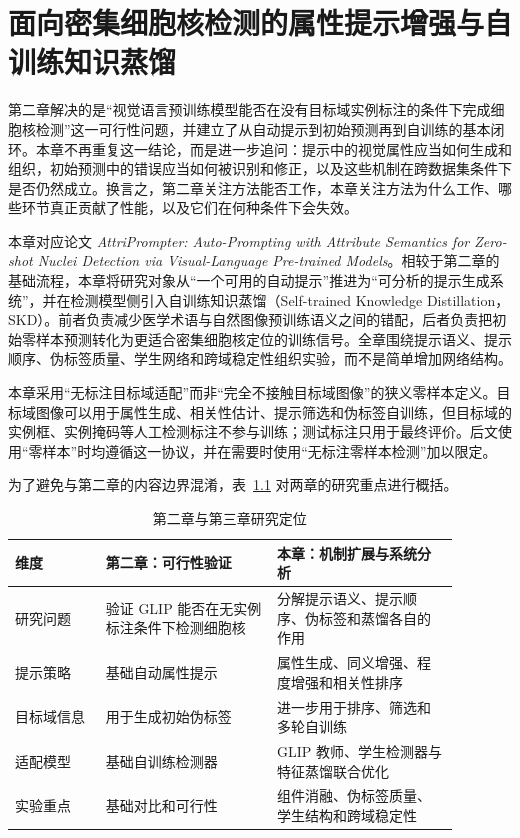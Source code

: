 \chapter{面向密集细胞核检测的属性提示增强与自训练知识蒸馏}

第二章解决的是“视觉语言预训练模型能否在没有目标域实例标注的条件下完成细胞核检测”这一可行性问题，并建立了从自动提示到初始预测再到自训练的基本闭环。本章不再重复这一结论，而是进一步追问：提示中的视觉属性应当如何生成和组织，初始预测中的错误应当如何被识别和修正，以及这些机制在跨数据集条件下是否仍然成立。换言之，第二章关注方法能否工作，本章关注方法为什么工作、哪些环节真正贡献了性能，以及它们在何种条件下会失效。

本章对应论文 \emph{AttriPrompter: Auto-Prompting with Attribute Semantics for Zero-shot Nuclei Detection via Visual-Language Pre-trained Models}。相较于第二章的基础流程，本章将研究对象从“一个可用的自动提示”推进为“可分析的提示生成系统”，并在检测模型侧引入自训练知识蒸馏（Self-trained Knowledge Distillation，SKD）。前者负责减少医学术语与自然图像预训练语义之间的错配，后者负责把初始零样本预测转化为更适合密集细胞核定位的训练信号。全章围绕提示语义、提示顺序、伪标签质量、学生网络和跨域稳定性组织实验，而不是简单增加网络结构。

本章采用“无标注目标域适配”而非“完全不接触目标域图像”的狭义零样本定义。目标域图像可以用于属性生成、相关性估计、提示筛选和伪标签自训练，但目标域的实例框、实例掩码等人工检测标注不参与训练；测试标注只用于最终评价。后文使用“零样本”时均遵循这一协议，并在需要时使用“无标注零样本检测”加以限定。

为了避免与第二章的内容边界混淆，表~\ref{tab:attrip_ch3_ch4_boundary} 对两章的研究重点进行概括。

\begin{table}[t]
\caption{第二章与第三章研究定位}
\label{tab:attrip_ch3_ch4_boundary}
\small
\begin{center}
\begin{tabular}{p{0.18\linewidth}p{0.34\linewidth}p{0.36\linewidth}}
\toprule[1.5pt]
\textbf{维度} & \textbf{第二章：可行性验证} & \textbf{本章：机制扩展与系统分析} \\ \midrule[1.2pt]
研究问题 & 验证 GLIP 能否在无实例标注条件下检测细胞核 & 分解提示语义、提示顺序、伪标签和蒸馏各自的作用 \\ 
提示策略 & 基础自动属性提示 & 属性生成、同义增强、程度增强和相关性排序 \\ 
目标域信息 & 用于生成初始伪标签 & 进一步用于排序、筛选和多轮自训练 \\ 
适配模型 & 基础自训练检测器 & GLIP 教师、学生检测器与特征蒸馏联合优化 \\ 
实验重点 & 基础对比和可行性 & 组件消融、伪标签质量、学生结构和跨域稳定性 \\ 
\bottomrule[1.5pt]
\end{tabular}
\end{center}
\end{table}

